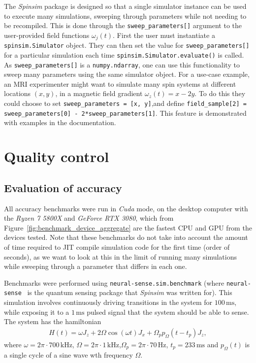\documentclass{jors}
\begin{document}
		The \emph{Spinsim} package is designed so that a single simulator instance can be used to execute many simulations, sweeping through parameters while not needing to be recompiled.
		This is done through the \texttt{sweep\_parameters[]} argument to the user-provided field functions $ \omega_j(t) $.
		First the user must instantiate a \texttt{spinsim.Simulator} object.
		They can then set the value for \texttt{sweep\_parameters[]} for a particular simulation each time \texttt{spinsim.Simulator.evaluate()} is called.
		As \texttt{sweep\_parameters[]} is a \texttt{numpy.ndarray}\cite{harris_array_2020}, one can use this functionality to sweep many parameters using the same simulator object.
		For a use-case example, an MRI experimenter might want to simulate many spin systems at different locations $ (x, y) $, in a magnetic field gradient $ \omega_z(t) = x - 2 y $.
		To do this they could choose to set \texttt{sweep\_parameters = [x, y]},\linebreak and define \texttt{field\_sample[2] = sweep\_parameters[0] - 2*sweep\_parameters[1]}.
		This feature is demonstrated with examples in the documentation.

\section{Quality control}
	\subsection{Evaluation of accuracy}\label{sec:accuracy}
		All accuracy benchmarks were run in \emph{Cuda} mode, on the desktop computer with the \emph{Ryzen 7 5800X} and \emph{GeForce RTX 3080}, which from Figure~\ref{fig:benchmark_device_aggregate} are the fastest CPU and GPU from the devices tested.
		Note that these benchmarks do not take into account the amount of time required to JIT compile simulation code for the first time (order of seconds), as we want to look at this in the limit of running many simulations while sweeping through a parameter that differs in each one.
		
		Benchmarks were performed using \texttt{neural-sense.sim.benchmark} (where \texttt{neural-sense}~\cite{alexander-tritt-monash_alexander-tritt-monashneural-sense_2020} is the quantum sensing package that \emph{Spinsim} was written for).
		This simulation involves continuously driving transitions in the system for $ 100\,\mathrm{ms} $, while exposing it to a $ 1\,\mathrm{ms} $ pulsed signal that the system should be able to sense.
		The system has the hamiltonian
		\begin{align}
			H(t) = \omega J_z + 2\Omega\cos(\omega t)J_x + \Omega_p p_\Omega(t - t_p) J_z,\label{eq:neural_pulse}
		\end{align}
		where $ \omega = 2\pi\cdot700\,\mathrm{kHz} $, $ \Omega = 2\pi\cdot1\,\mathrm{kHz} $,$ \Omega_p = 2\pi\cdot70\,\mathrm{Hz} $, $ t_p = 233\,\mathrm{ms} $ and $ p_\Omega(t) $ is a single cycle of a sine wave wth frequency $ \Omega $.
\end{document}
